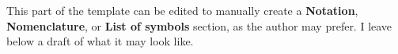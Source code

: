 %
%
%
%
%
%

\begingroup
\setlength{\LTpre}{0pt}

\setlength{\LTleft}{0pt}
\setlength{\LTright}{\fill}

\setcounter{secnumdepth}{0}

{}
\chapter*{\mynotationname}
\markboth{\mynotationname}{}
\label{notation}

This part of the template can be edited to manually create a \textbf{Notation}, \textbf{Nomenclature}, or \textbf{List of symbols} section, as the author may prefer.
I leave below a draft of what it may look like.


